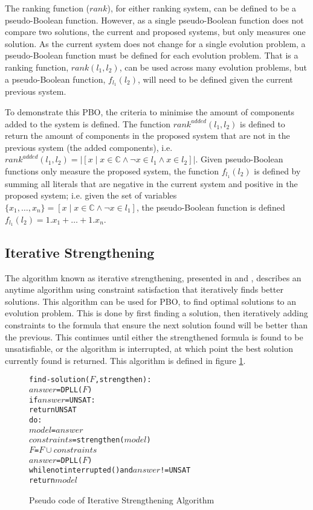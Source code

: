 The ranking function ($rank$), for either ranking system, can be defined to be a pseudo-Boolean function.
However, as a single pseudo-Boolean function does not compare two solutions, the current and proposed systems, but only measures one solution.
As the current system does not change for a single evolution problem, a pseudo-Boolean function must be defined for each evolution problem.
That is a ranking function, $rank(l_1,l_2)$, can be used across many evolution problems, but a  pseudo-Boolean function, $f_{l_1}(l_2)$, will need to be defined given the current previous system.

To demonstrate this PBO, the criteria to minimise the amount of components added to the system is defined.
The function $rank^{added}(l_1,l_2)$ is defined to return the amount of components in the proposed system that are not in the previous system (the added components),
i.e. $rank^{added}(l_1,l_2) = |[x \mid x \in \mathbb{C} \wedge \neg x \in l_1 \wedge x \in l_2]|$.
Given pseudo-Boolean functions only measure the proposed system,
the function $f_{l_1}(l_2)$ is defined by summing all literals that are negative in the current system and positive in the proposed system;
i.e. given the set of variables $\{x_1,\ldots,x_n\} = [x \mid x \in \mathbb{C} \wedge \neg x \in l_1]$, the pseudo-Boolean function is defined $f_{l_1}(l_2) =  1.x_1 + \ldots +  1.x_n$.

\subsection{Iterative Strengthening}
The algorithm known as iterative strengthening, presented in \citep{calistri1994iterative} and \citep{le2010sat4j}, 
describes an anytime algorithm using constraint satisfaction that iteratively finds better solutions.
This algorithm can be used for PBO, to find optimal solutions to an evolution problem.
This is done by first finding a solution, then iteratively adding constraints to the formula that ensure the next solution found will be better than the previous.
This continues until either the strengthened formula is found to be unsatisfiable, or the algorithm is interrupted, at which point the best solution currently found is returned. 
This algorithm is defined in figure \ref{impl.strength}.

\begin{figure}[htp]
\begin{center}
\begin{alltt}
find-solution(\(F\),strengthen):
    \(answer\) = DPLL(\(F\))
    if \(answer\) = UNSAT:
        return UNSAT
    do:
        \(model\) = \(answer\)
        \(constraints\) = strengthen(\(model\))
        \(F\) = \(F \cup constraints\)
        \(answer\) = DPLL(\(F\))
    while not interrupted() and \(answer\) != UNSAT
    return \(model\) 
\end{alltt}
  \caption{Pseudo code of Iterative Strengthening Algorithm}
  \label{impl.strength}
\end{center}
\end{figure}

